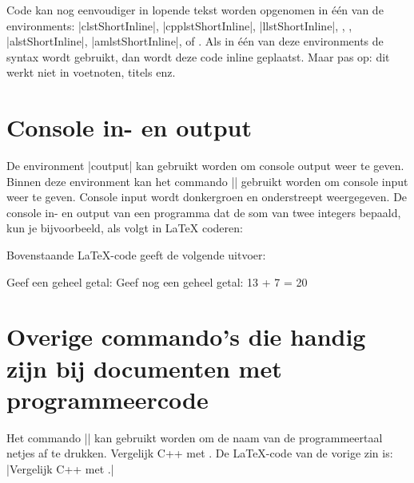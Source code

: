Code kan nog eenvoudiger in lopende tekst worden opgenomen in één van de environments: |clstShortInline|, |cpplstShortInline|, |llstShortInline|, {\lstlenvironment{}}, {\lstlenvironment{}}, 
|alstShortInline|, |amlstShortInline|, {\lstlenvironment{}}  of {\lstlenvironment{}}.
Als in één van deze environments de syntax  wordt gebruikt, dan wordt deze code inline geplaatst.
Maar pas op: dit werkt niet in voetnoten, titels enz.

\section{Console in- en output}
De environment |coutput| kan gebruikt worden om console output weer te geven.
Binnen deze environment kan het commando |\cinput| gebruikt worden om console input weer te geven.
Console input wordt donkergroen en onderstreept weergegeven.
De console in- en output van een programma dat de som van twee integers bepaald, kun je bijvoorbeeld, als volgt in \LaTeX{} coderen:


Bovenstaande \LaTeX{}-code geeft de volgende uitvoer:
\begin{coutput}
Geef een geheel getal: 
Geef nog een geheel getal: 
13 + 7 = 20
\end{coutput}

\section{Overige commando's die handig zijn bij documenten met programmeercode}
Het commando |\Cpp| kan gebruikt worden om de naam van de programmeertaal \Cpp{} netjes af te drukken.
Vergelijk C++ met \Cpp{}.
De \LaTeX{}-code van de vorige zin is: |Vergelijk C++ met \Cpp{}.|

